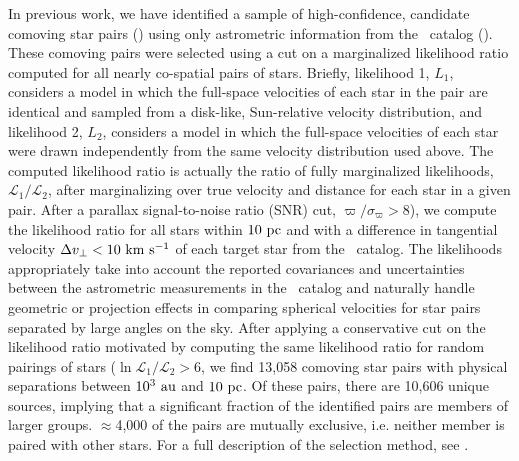 \documentclass[modern, letterpaper]{aastex61}
\newcommand{\tgas}{\acronym{TGAS}}
\begin{document}
In previous work, we have identified a sample of high-confidence, candidate
comoving star pairs (\citealt{Oh:2017}) using only astrometric information from
the \tgas\ catalog (\citealt{Michalik:2015,Gaia-Collaboration:2016a}).
These comoving pairs were selected using a cut on a marginalized likelihood
ratio computed for all nearly co-spatial pairs of stars.
Briefly, likelihood 1, $L_1$, considers a model in which the full-space
velocities of each star in the pair are identical and sampled from a disk-like,
Sun-relative velocity distribution, and likelihood 2, $L_2$, considers a model
in which the full-space velocities of each star were drawn independently from
the same velocity distribution used above. The computed likelihood ratio is
actually the ratio of fully marginalized likelihoods,
$\mathcal{L}_1/\mathcal{L}_2$, after marginalizing over true velocity and
distance for each star in a given pair.
After a parallax signal-to-noise ratio (SNR) cut, $\varpi/\sigma_\varpi > 8$),
we compute the likelihood ratio for all stars within $10~\mathrm{pc}$ and with a
difference in tangential velocity $\Delta v_\perp < 10~\mathrm{km}~\mathrm{s}^{-1}$ of each target star
from the \tgas\ catalog.
The likelihoods appropriately take into account the reported covariances and
uncertainties between the astrometric measurements in the \tgas\ catalog and
naturally handle geometric or projection effects in comparing spherical
velocities for star pairs separated by large angles on the sky.
After applying a conservative cut on the likelihood ratio motivated by computing
the same likelihood ratio for random pairings of stars ($\ln
\mathcal{L}_1/\mathcal{L}_2 > 6$, we find 13,058 comoving star pairs with
physical separations between $10^3~\mathrm{au}$ and $10~\mathrm{pc}$.
Of these pairs, there are 10,606 unique sources, implying that a significant
fraction of the identified pairs are members of larger groups.
$\approx$4,000 of the pairs are mutually exclusive, i.e. neither member is
paired with other stars.
For a full description of the selection method, see \citealt{Oh:2017}.
\end{document}
